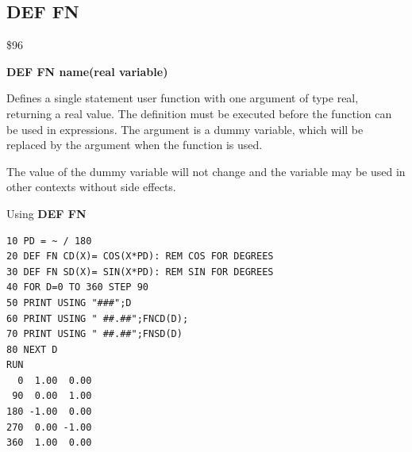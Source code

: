 \subsection{DEF FN}
\begin{description}[leftmargin=2cm,style=nextline]
\item [Token:] \$96
\item [Format:] {\bf DEF FN name(real variable)}
\item [Usage:] Defines a single statement
               user function with one argument of type real,
               returning a real value.
               The definition must be executed before the function
               can be used in expressions. The argument is
               a dummy variable, which will be replaced by the
               argument when the function is used.

\item [Remarks:] The value of the dummy variable will not change
                 and the variable may be used in other contexts
                 without side effects.

\item [Example:] Using {\bf DEF FN}
\begin{tcolorbox}[colback=black,coltext=white]
\verbatimfont{\codefont}
\begin{verbatim}
10 PD = ~ / 180
20 DEF FN CD(X)= COS(X*PD): REM COS FOR DEGREES
30 DEF FN SD(X)= SIN(X*PD): REM SIN FOR DEGREES
40 FOR D=0 TO 360 STEP 90
50 PRINT USING "###";D
60 PRINT USING " ##.##";FNCD(D);
70 PRINT USING " ##.##";FNSD(D)
80 NEXT D
RUN
  0  1.00  0.00
 90  0.00  1.00
180 -1.00  0.00
270  0.00 -1.00
360  1.00  0.00
\end{verbatim}
\end{tcolorbox}
\end{description}


\newpage
